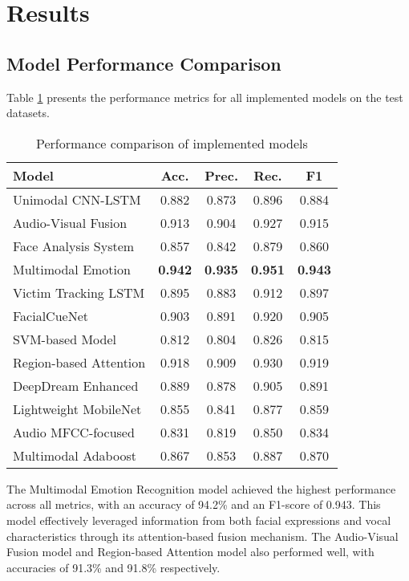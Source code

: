 \documentclass[conference,compsoc]{IEEEtran}
\begin{document}
\section{Results}
\FloatBarrier
\subsection{Model Performance Comparison}
Table \ref{tab:model_performance} presents the performance metrics for all implemented models on the test datasets.

\begin{table}[!t]
\caption{Performance comparison of implemented models}
\label{tab:model_performance}
\centering
\renewcommand{\arraystretch}{1.2}
\begin{tabularx}{\columnwidth}{>{\raggedright\arraybackslash}X cccc}
\toprule
\textbf{Model} & \textbf{Acc.} & \textbf{Prec.} & \textbf{Rec.} & \textbf{F1} \\
\midrule
Unimodal CNN-LSTM & 0.882 & 0.873 & 0.896 & 0.884 \\
Audio-Visual Fusion & 0.913 & 0.904 & 0.927 & 0.915 \\
Face Analysis System & 0.857 & 0.842 & 0.879 & 0.860 \\
Multimodal Emotion & \textbf{0.942} & \textbf{0.935} & \textbf{0.951} & \textbf{0.943} \\
Victim Tracking LSTM & 0.895 & 0.883 & 0.912 & 0.897 \\
FacialCueNet & 0.903 & 0.891 & 0.920 & 0.905 \\
SVM-based Model & 0.812 & 0.804 & 0.826 & 0.815 \\
Region-based Attention & 0.918 & 0.909 & 0.930 & 0.919 \\
DeepDream Enhanced & 0.889 & 0.878 & 0.905 & 0.891 \\
Lightweight MobileNet & 0.855 & 0.841 & 0.877 & 0.859 \\
Audio MFCC-focused & 0.831 & 0.819 & 0.850 & 0.834 \\
Multimodal Adaboost & 0.867 & 0.853 & 0.887 & 0.870 \\
\bottomrule
\end{tabularx}
\end{table}

The Multimodal Emotion Recognition model achieved the highest performance across all metrics, with an accuracy of 94.2\% and an F1-score of 0.943. This model effectively leveraged information from both facial expressions and vocal characteristics through its attention-based fusion mechanism. The Audio-Visual Fusion model and Region-based Attention model also performed well, with accuracies of 91.3\% and 91.8\% respectively.
\end{document}
